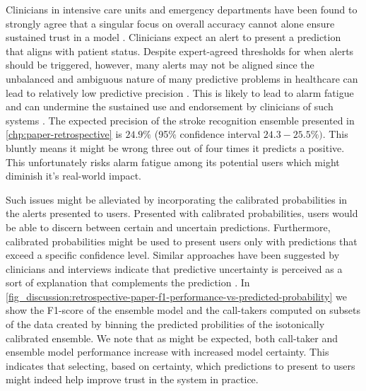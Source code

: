 Clinicians in intensive care units and emergency departments have been found to strongly agree that a singular focus on overall accuracy cannot alone ensure sustained trust in a model \cite{tonekaboni_what_2019}. Clinicians expect an alert to present a prediction that aligns with patient status. Despite expert-agreed thresholds for when alerts should be triggered, however, many alerts may not be aligned since the unbalanced and ambiguous nature of many predictive problems in healthcare can lead to relatively low predictive precision \parencite{umscheid_development_2015, cite14, cite15, wenstrup_retrospective_2023}. This is likely to lead to alarm fatigue \parencite{embi_evaluating_2012} and can undermine the sustained use and endorsement by clinicians of such systems \parencite{guidi_clinician_2015}. 
The expected precision of the stroke recognition ensemble presented in \cref{chp:paper-retrospective} is $24.9\%$ (95\% confidence interval $24.3-25.5\%)$. This bluntly means it might be wrong three out of four times it predicts a positive. This unfortunately risks alarm fatigue among its potential users which might diminish it's real-world impact.

Such issues might be alleviated by incorporating the calibrated probabilities in the alerts presented to users. Presented with calibrated probabilities, users would be able to discern between certain and uncertain predictions. Furthermore, calibrated probabilities might be used to present users only with predictions that exceed a specific confidence level. Similar approaches have been suggested by clinicians and interviews indicate that predictive uncertainty is perceived as a sort of explanation that complements the prediction \cite{tonekaboni_what_2019}. In \cref{fig_discussion:retrospective-paper-f1-performance-vs-predicted-probability} we show the F1-score of the ensemble model and the call-takers computed on subsets of the data created by binning the predicted probilities of the isotonically calibrated ensemble. We note that as might be expected, both call-taker and ensemble model performance increase with increased model certainty. This indicates that selecting, based on certainty, which predictions to present to users might indeed help improve trust in the system in practice. 


